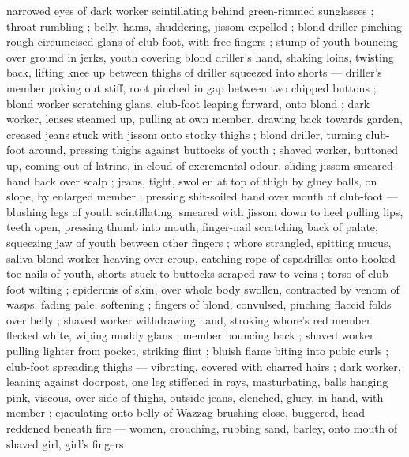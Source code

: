 narrowed eyes of dark worker scintillating behind green-rimmed sunglasses ; throat rumbling ; belly, hams, shuddering, jissom expelled ; blond driller pinching rough-circumcised glans of club-foot, with free fingers ; stump of youth bouncing over ground in jerks, youth covering blond driller's hand, shaking loins, twisting back, lifting knee up between thighs of driller squeezed into shorts --- driller's member poking out stiff, root pinched in gap between two chipped buttons ; blond worker scratching glans, club-foot leaping forward, onto blond ; dark worker, lenses steamed up, pulling at own member, drawing back towards garden, creased jeans stuck with jissom onto stocky thighs ; blond driller, turning club-foot around, pressing thighs against buttocks of youth ; shaved worker, buttoned up, coming out of latrine, in cloud of excremental odour, sliding jissom-smeared hand back over scalp ; jeans, tight, swollen at top of thigh by gluey balls, on slope, by enlarged member ; pressing shit-soiled hand over mouth of club-foot --- blushing legs of youth scintillating, smeared with jissom down to heel {\dashcol} pulling lips, teeth open, pressing thumb into mouth, finger-nail scratching back of palate, squeezing jaw of youth between other fingers ; whore strangled, spitting mucus, saliva {\col} blond worker heaving over croup, catching rope of espadrilles onto hooked toe-nails of youth, shorts stuck to buttocks scraped raw to veins ; torso of club-foot wilting ; epidermis of skin, over whole body swollen, contracted by venom of wasps, fading pale, softening ; fingers of blond, convulsed, pinching flaccid folds over belly ; shaved worker withdrawing hand, stroking whore's red member flecked white, wiping muddy glans ; member bouncing back ; shaved worker pulling lighter from pocket, striking flint ; bluish flame biting into pubic curls ; club-foot spreading thighs --- vibrating, covered with charred hairs ; dark worker, leaning against doorpost, one leg stiffened in rays, masturbating, balls hanging pink, viscous, over side of thighs, outside jeans, clenched, gluey, in hand, with member ; ejaculating onto belly of Wazzag brushing close, buggered, head reddened beneath fire --- women, crouching, rubbing sand, barley, onto mouth of shaved girl, girl's fingers 
